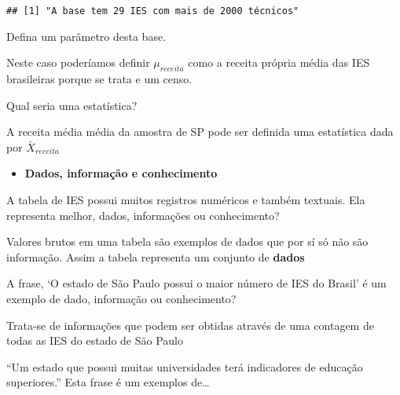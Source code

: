 \documentclass[11pt,]{style/krantz}
\providecommand{\tightlist}{%
  \setlength{\itemsep}{0pt}\setlength{\parskip}{0pt}}
\theoremstyle{definition}
\theoremstyle{definition}
\theoremstyle{definition}
\theoremstyle{remark}
\let\BeginKnitrBlock\begin \let\EndKnitrBlock\end
\begin{document}
\begin{verbatim}
## [1] "A base tem 29 IES com mais de 2000 técnicos"
\end{verbatim}

\BeginKnitrBlock{exercise}
\protect\hypertarget{exr:unnamed-chunk-12}{}{\label{exr:unnamed-chunk-12} }Defina um parâmetro desta base.
\EndKnitrBlock{exercise}

\BeginKnitrBlock{solution}
\iffalse{} {Solução. } \fi{}Neste caso poderíamos definir \(\mu_{receita}\) como a receita própria média das IES brasileiras porque se trata e um censo.
\EndKnitrBlock{solution}

\BeginKnitrBlock{exercise}
\protect\hypertarget{exr:unnamed-chunk-14}{}{\label{exr:unnamed-chunk-14} }Qual seria uma estatística?
\EndKnitrBlock{exercise}

\BeginKnitrBlock{solution}
\iffalse{} {Solução. } \fi{}A receita média média da amostra de SP pode ser definida uma estatística dada por \(\bar X_{receita}\)
\EndKnitrBlock{solution}

\begin{itemize}
\tightlist
\item
  \textbf{Dados, informação e conhecimento}
\end{itemize}

\BeginKnitrBlock{exercise}
\protect\hypertarget{exr:unnamed-chunk-16}{}{\label{exr:unnamed-chunk-16} }A tabela de IES possui muitos registros numéricos e também textuais. Ela representa melhor, dados, informações ou conhecimento?
\EndKnitrBlock{exercise}

\BeginKnitrBlock{solution}
\iffalse{} {Solução. } \fi{}Valores brutos em uma tabela são exemplos de dados que por sí só não são informação. Assim a tabela representa um conjunto de \textbf{dados}
\EndKnitrBlock{solution}

\BeginKnitrBlock{exercise}
\protect\hypertarget{exr:unnamed-chunk-18}{}{\label{exr:unnamed-chunk-18} }A frase, `O estado de São Paulo possui o maior número de IES do Brasil' é um exemplo de dado, informação ou conhecimento?
\EndKnitrBlock{exercise}

\BeginKnitrBlock{solution}
\iffalse{} {Solução. } \fi{}Trata-se de informações que podem ser obtidas através de uma contagem de todas as IES do estado de São Paulo
\EndKnitrBlock{solution}

\BeginKnitrBlock{exercise}
\protect\hypertarget{exr:unnamed-chunk-20}{}{\label{exr:unnamed-chunk-20} }``Um estado que possui muitas universidades terá indicadores de educação superiores.'' Esta frase é um exemplos de\ldots{}
\EndKnitrBlock{exercise}
\end{document}

